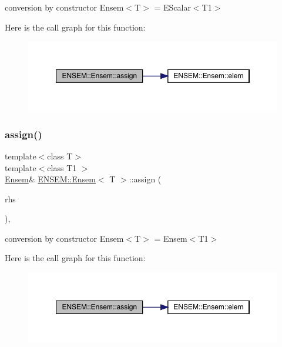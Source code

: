 conversion by constructor Ensem$<$\+T$>$ = E\+Scalar$<$\+T1$>$ 

Here is the call graph for this function\+:
\nopagebreak
\begin{figure}[H]
\begin{center}
\leavevmode
\includegraphics[width=350pt]{d7/d3e/classENSEM_1_1Ensem_aa09448269bc5b72687905254739bf69a_cgraph}
\end{center}
\end{figure}
\mbox{\label{classENSEM_1_1Ensem_a43d968c090e5f6c518881cf7ff44d200}} 
\subsubsection{\texorpdfstring{assign()}{assign()}\hspace{0.1cm}{\footnotesize\ttfamily [3/8]}}
{\footnotesize\ttfamily template$<$class T$>$ \\
template$<$class T1 $>$ \\
\mbox{\hyperlink{classENSEM_1_1Ensem}{Ensem}}\& \mbox{\hyperlink{classENSEM_1_1Ensem}{E\+N\+S\+E\+M\+::\+Ensem}}$<$ T $>$\+::assign (\begin{DoxyParamCaption}\item[{const \mbox{\hyperlink{classENSEM_1_1Ensem}{Ensem}}$<$ T1 $>$ \&}]{rhs }\end{DoxyParamCaption})\hspace{0.3cm}{\ttfamily [inline]}, {\ttfamily [protected]}}



conversion by constructor Ensem$<$\+T$>$ = Ensem$<$\+T1$>$ 

Here is the call graph for this function\+:
\nopagebreak
\begin{figure}[H]
\begin{center}
\leavevmode
\includegraphics[width=350pt]{d7/d3e/classENSEM_1_1Ensem_a43d968c090e5f6c518881cf7ff44d200_cgraph}
\end{center}
\end{figure}
\mbox{\label{classENSEM_1_1Ensem_a43d968c090e5f6c518881cf7ff44d200}} 
